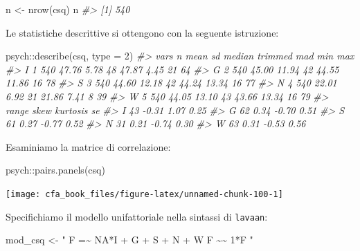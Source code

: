 \documentclass[
  11pt,
]{krantz}
\makeatletter
\newenvironment{Shaded}{\begin{snugshade}}{\end{snugshade}}
\newcommand{\AttributeTok}[1]{\textcolor[rgb]{0.61,0.61,0.61}{#1}}
\newcommand{\CommentTok}[1]{\textcolor[rgb]{0.37,0.37,0.37}{\textit{#1}}}
\newcommand{\DecValTok}[1]{\textcolor[rgb]{0.06,0.06,0.06}{#1}}
\newcommand{\FunctionTok}[1]{\textcolor[rgb]{0,0,0}{#1}}
\newcommand{\NormalTok}[1]{#1}
\newcommand{\OtherTok}[1]{\textcolor[rgb]{0.37,0.37,0.37}{#1}}
\newcommand{\SpecialCharTok}[1]{\textcolor[rgb]{0,0,0}{#1}}
\newcommand{\StringTok}[1]{\textcolor[rgb]{0.5,0.5,0.5}{#1}}
\newenvironment{kframe}{%
\medskip{}
\setlength{\fboxsep}{.8em}
 \def\at@end@of@kframe{}%
 \ifinner\ifhmode%
  \def\at@end@of@kframe{\end{minipage}}%
  \begin{minipage}{\columnwidth}%
 \fi\fi%
 \def\FrameCommand##1{\hskip\@totalleftmargin \hskip-\fboxsep
 \colorbox{shadecolor}{##1}\hskip-\fboxsep
     \hskip-\linewidth \hskip-\@totalleftmargin \hskip\columnwidth}%
 \MakeFramed {\advance\hsize-\width
   \@totalleftmargin\z@ \linewidth\hsize
   \@setminipage}}%
 {\par\unskip\endMakeFramed%
 \at@end@of@kframe}
\renewenvironment{Shaded}{\begin{kframe}}{\end{kframe}}
\theoremstyle{definition}
\theoremstyle{definition}
\theoremstyle{definition}
\theoremstyle{definition}
\theoremstyle{remark}
\makeatother
\begin{document}
\begin{Shaded}
\begin{Highlighting}[]
\NormalTok{n }\OtherTok{\textless{}{-}} \FunctionTok{nrow}\NormalTok{(csq)}
\NormalTok{n}
\CommentTok{\#\textgreater{} [1] 540}
\end{Highlighting}
\end{Shaded}

Le statistiche descrittive si ottengono con la seguente istruzione:

\begin{Shaded}
\begin{Highlighting}[]
\NormalTok{psych}\SpecialCharTok{::}\FunctionTok{describe}\NormalTok{(csq, }\AttributeTok{type =} \DecValTok{2}\NormalTok{)}
\CommentTok{\#\textgreater{}   vars   n  mean    sd median trimmed   mad min max}
\CommentTok{\#\textgreater{} I    1 540 47.76  5.78     48   47.87  4.45  21  64}
\CommentTok{\#\textgreater{} G    2 540 45.00 11.94     42   44.55 11.86  16  78}
\CommentTok{\#\textgreater{} S    3 540 44.60 12.18     42   44.24 13.34  16  77}
\CommentTok{\#\textgreater{} N    4 540 22.01  6.92     21   21.86  7.41   8  39}
\CommentTok{\#\textgreater{} W    5 540 44.05 13.10     43   43.66 13.34  16  79}
\CommentTok{\#\textgreater{}   range  skew kurtosis   se}
\CommentTok{\#\textgreater{} I    43 {-}0.31     1.07 0.25}
\CommentTok{\#\textgreater{} G    62  0.34    {-}0.70 0.51}
\CommentTok{\#\textgreater{} S    61  0.27    {-}0.77 0.52}
\CommentTok{\#\textgreater{} N    31  0.21    {-}0.74 0.30}
\CommentTok{\#\textgreater{} W    63  0.31    {-}0.53 0.56}
\end{Highlighting}
\end{Shaded}

Esaminiamo la matrice di correlazione:

\begin{Shaded}
\begin{Highlighting}[]
\NormalTok{psych}\SpecialCharTok{::}\FunctionTok{pairs.panels}\NormalTok{(csq)}
\end{Highlighting}
\end{Shaded}

\begin{center}\texttt{[image: cfa\_book\_files/figure-latex/unnamed-chunk-100-1]} \end{center}

Specifichiamo il modello unifattoriale nella sintassi di \texttt{lavaan}:

\begin{Shaded}
\begin{Highlighting}[]
\NormalTok{mod\_csq }\OtherTok{\textless{}{-}} \StringTok{"}
\StringTok{   F =\textasciitilde{} NA*I + G + S + N + W}
\StringTok{   F \textasciitilde{}\textasciitilde{} 1*F}
\StringTok{"}
\end{Highlighting}
\end{Shaded}
\end{document}
